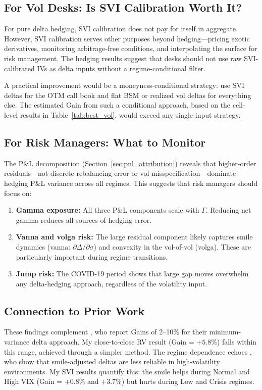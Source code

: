 \documentclass[12pt, letterpaper]{article}
\begin{document}
\subsection{For Vol Desks: Is SVI Calibration Worth It?}

For pure delta hedging, SVI calibration does not pay for itself in aggregate. However, SVI calibration serves other purposes beyond hedging---pricing exotic derivatives, monitoring arbitrage-free conditions, and interpolating the surface for risk management. The hedging results suggest that desks should not use raw SVI-calibrated IVs as delta inputs without a regime-conditional filter.

A practical improvement would be a moneyness-conditional strategy: use SVI deltas for the OTM call book and flat BSM or realized vol deltas for everything else. The estimated Gain from such a conditional approach, based on the cell-level results in Table~\ref{tab:best_vol}, would exceed any single-input strategy.

\subsection{For Risk Managers: What to Monitor}

The P\&L decomposition (Section~\ref{sec:pnl_attribution}) reveals that higher-order residuals---not discrete rebalancing error or vol misspecification---dominate hedging P\&L variance across all regimes. This suggests that risk managers should focus on:
\begin{enumerate}
    \item \textbf{Gamma exposure:} All three P\&L components scale with $\Gamma$. Reducing net gamma reduces all sources of hedging error.
    \item \textbf{Vanna and volga risk:} The large residual component likely captures smile dynamics (vanna: $\partial\Delta/\partial\sigma$) and convexity in the vol-of-vol (volga). These are particularly important during regime transitions.
    \item \textbf{Jump risk:} The COVID-19 period shows that large gap moves overwhelm any delta-hedging approach, regardless of the volatility input.
\end{enumerate}

\subsection{Connection to Prior Work}

These findings complement \citet{Hull2017}, who report Gains of 2--10\% for their minimum-variance delta approach. My close-to-close RV result (Gain = $+5.8\%$) falls within this range, achieved through a simpler method. The regime dependence echoes \citet{Alexander2012}, who show that smile-adjusted deltas are less reliable in high-volatility environments. My SVI results quantify this: the smile helps during Normal and High VIX (Gain = $+0.8\%$ and $+3.7\%$) but hurts during Low and Crisis regimes.
\end{document}

